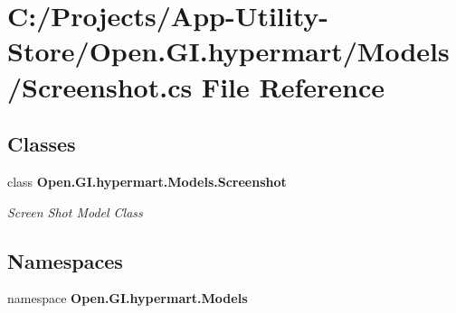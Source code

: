 \section{C\+:/\+Projects/\+App-\/\+Utility-\/\+Store/\+Open.G\+I.\+hypermart/\+Models/\+Screenshot.cs File Reference}
\label{_models_2_screenshot_8cs}
\subsection*{Classes}
\begin{DoxyCompactItemize}
\item 
class \textbf{ Open.\+G\+I.\+hypermart.\+Models.\+Screenshot}
\begin{DoxyCompactList}\small\item\em Screen Shot Model Class \end{DoxyCompactList}\end{DoxyCompactItemize}
\subsection*{Namespaces}
\begin{DoxyCompactItemize}
\item 
namespace \textbf{ Open.\+G\+I.\+hypermart.\+Models}
\end{DoxyCompactItemize}
